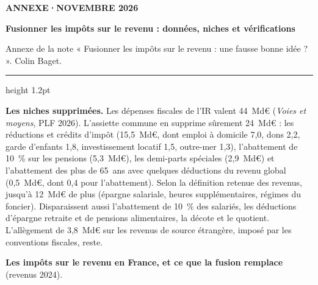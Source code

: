 \documentclass[11pt,a4paper]{article}
\begin{document}
\renewcommand{\tablename}{Tableau}
\thispagestyle{empty}
{\footnotesize\color{ocre}\bfseries ANNEXE\quad·\quad NOVEMBRE 2026\par}
\vspace{6pt}
{\fontsize{18}{22}\selectfont\bfseries\color{bleu}Fusionner les impôts sur le revenu : données, niches et vérifications\par}
\vspace{5pt}
{\small Annexe de la note « Fusionner les impôts sur le revenu : une fausse bonne idée ? ». Colin Baget.\par}
\vspace{5pt}
{\color{bleu}\hrule height 1.2pt}
\vspace{8pt}

\textbf{Les niches supprimées.} Les dépenses fiscales de l'IR valent 44~Md€ (\emph{Voies et moyens}, PLF 2026).
L'assiette commune en supprime sûrement 24~Md€ : les réductions et crédits d'impôt (15,5~Md€, dont emploi à
domicile 7,0, dons 2,2, garde d'enfants 1,8, investissement locatif 1,5, outre-mer 1,3), l'abattement de
10~\% sur les pensions (5,3~Md€), les demi-parts spéciales (2,9~Md€) et l'abattement des plus de 65~ans
avec quelques déductions du revenu global (0,5~Md€, dont 0,4 pour l'abattement). Selon la définition retenue des revenus, jusqu'à 12~Md€ de plus (épargne salariale, heures
supplémentaires, régimes du foncier). Disparaissent aussi l'abattement de 10~\% des salariés, les
déductions d'épargne retraite et de pensions alimentaires, la décote et le quotient. L'allègement de 3,8~Md€
sur les revenus de source étrangère, imposé par les conventions fiscales, reste.

\textbf{Les impôts sur le revenu en France, et ce que la fusion remplace} (revenus 2024).
\end{document}

